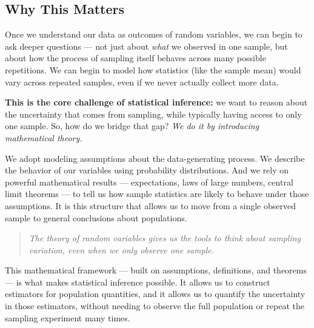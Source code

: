 \documentclass[12pt]{article}
\begin{document}
\subsection*{Why This Matters}

Once we understand our data as outcomes of random variables, we can begin to ask deeper questions — not just about \textit{what} we observed in one sample, but about how the process of sampling itself behaves across many possible repetitions. We can begin to model how statistics (like the sample mean) would vary across repeated samples, even if we never actually collect more data.

\textbf{This is the core challenge of statistical inference:} we want to reason about the uncertainty that comes from sampling, while typically having access to only one sample. So, how do we bridge that gap? \textit{We do it by introducing mathematical theory.}

We adopt modeling assumptions about the data-generating process. We describe the behavior of our variables using probability distributions. And we rely on powerful mathematical results — expectations, laws of large numbers, central limit theorems — to tell us how sample statistics are likely to behave under those assumptions. It is this structure that allows us to move from a single observed sample to general conclusions about populations. 

\begin{quote}
    \textit{The theory of random variables gives us the tools to think about sampling variation, even when we only observe one sample.}
\end{quote}

This mathematical framework — built on assumptions, definitions, and theorems — is what makes statistical inference possible. It allows us to construct estimators for population quantities, and it allows us to quantify the uncertainty in those estimators, without needing to observe the full population or repeat the sampling experiment many times.
\end{document}
